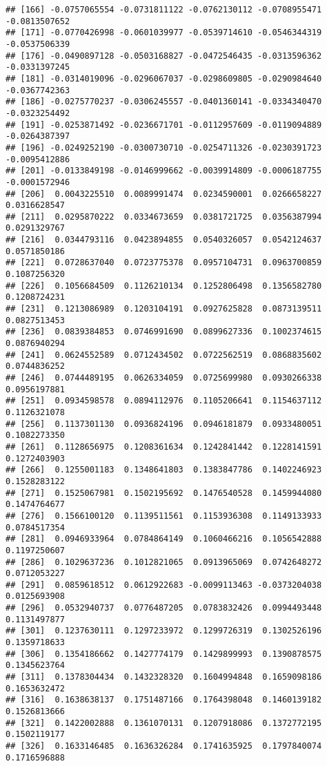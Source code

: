 \documentclass[
]{article}
\begin{document}
\begin{verbatim}
## [166] -0.0757065554 -0.0731811122 -0.0762130112 -0.0708955471 -0.0813507652
## [171] -0.0770426998 -0.0601039977 -0.0539714610 -0.0546344319 -0.0537506339
## [176] -0.0490897128 -0.0503168827 -0.0472546435 -0.0313596362 -0.0331397245
## [181] -0.0314019096 -0.0296067037 -0.0298609805 -0.0290984640 -0.0367742363
## [186] -0.0275770237 -0.0306245557 -0.0401360141 -0.0334340470 -0.0323254492
## [191] -0.0253871492 -0.0236671701 -0.0112957609 -0.0119094889 -0.0264387397
## [196] -0.0249252190 -0.0300730710 -0.0254711326 -0.0230391723 -0.0095412886
## [201] -0.0133849198 -0.0146999662 -0.0039914809 -0.0006187755 -0.0001572946
## [206]  0.0043225510  0.0089991474  0.0234590001  0.0266658227  0.0316628547
## [211]  0.0295870222  0.0334673659  0.0381721725  0.0356387994  0.0291329767
## [216]  0.0344793116  0.0423894855  0.0540326057  0.0542124637  0.0571850186
## [221]  0.0728637040  0.0723775378  0.0957104731  0.0963700859  0.1087256320
## [226]  0.1056684509  0.1126210134  0.1252806498  0.1356582780  0.1208724231
## [231]  0.1213086989  0.1203104191  0.0927625828  0.0873139511  0.0827513453
## [236]  0.0839384853  0.0746991690  0.0899627336  0.1002374615  0.0876940294
## [241]  0.0624552589  0.0712434502  0.0722562519  0.0868835602  0.0744836252
## [246]  0.0744489195  0.0626334059  0.0725699980  0.0930266338  0.0956197881
## [251]  0.0934598578  0.0894112976  0.1105206641  0.1154637112  0.1126321078
## [256]  0.1137301130  0.0936824196  0.0946181879  0.0933480051  0.1082273350
## [261]  0.1128656975  0.1208361634  0.1242841442  0.1228141591  0.1272403903
## [266]  0.1255001183  0.1348641803  0.1383847786  0.1402246923  0.1528283122
## [271]  0.1525067981  0.1502195692  0.1476540528  0.1459944080  0.1474764677
## [276]  0.1566100120  0.1139511561  0.1153936308  0.1149133933  0.0784517354
## [281]  0.0946933964  0.0784864149  0.1060466216  0.1056542888  0.1197250607
## [286]  0.1029637236  0.1012821065  0.0913965069  0.0742648272  0.0712053227
## [291]  0.0859618512  0.0612922683 -0.0099113463 -0.0373204038  0.0125693908
## [296]  0.0532940737  0.0776487205  0.0783832426  0.0994493448  0.1131497877
## [301]  0.1237630111  0.1297233972  0.1299726319  0.1302526196  0.1359718633
## [306]  0.1354186662  0.1427774179  0.1429899993  0.1390878575  0.1345623764
## [311]  0.1378304434  0.1432328320  0.1604994848  0.1659098186  0.1653632472
## [316]  0.1638638137  0.1751487166  0.1764398048  0.1460139182  0.1526813666
## [321]  0.1422002888  0.1361070131  0.1207918086  0.1372772195  0.1502119177
## [326]  0.1633146485  0.1636326284  0.1741635925  0.1797840074  0.1716596888

\end{verbatim}
\end{document}
